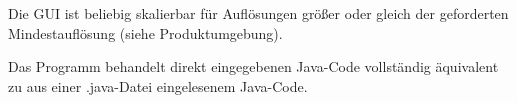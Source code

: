 
Die GUI ist beliebig skalierbar für Auflösungen größer oder gleich der geforderten Mindestauflösung (siehe Produktumgebung).


Das Programm behandelt direkt eingegebenen Java-Code vollständig äquivalent zu aus einer .java-Datei eingelesenem Java-Code.
